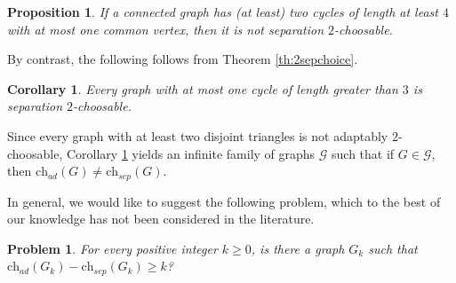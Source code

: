 \documentclass[12pt]{article}
\newtheorem{problem}[theorem]{Problem}
\newtheorem{proposition}[theorem]{Proposition}
\newtheorem{corollary}[theorem]{Corollary}
\newcommand{\single}{\chi_{\nleftrightarrow}}
\newcommand{\ch}{\mathrm{ch}}
\begin{document}
\begin{proposition}
\label{prop:disjointcycles}
If a connected graph has (at least) two
cycles of length at least $4$ with at most one common vertex,
 then it is 
not separation $2$-choosable.
\end{proposition}

	

	By contrast, the following follows from Theorem \ref{th:2sepchoice}.

\begin{corollary}
\label{cor:triangle}
	Every graph with at most one cycle of length greater than $3$ is separation 
	$2$-choosable.
\end{corollary}
	
Since every graph with at least two disjoint triangles is not adaptably $2$-choosable,
Corollary \ref{cor:triangle} yields an infinite
family of graphs $\mathcal{G}$ such that if $G \in \mathcal{G}$, then 
$\ch_{ad}(G) \neq \ch_{sep}(G)$.





%
%





In general, we would like to suggest the following problem, which to the best of our knowledge
has not been considered in the literature.

\begin{problem}
	For every positive integer $k \geq 0$, is there a graph $G_k$ such that
	$\ch_{ad}(G_k) - \ch_{sep}(G_k) \geq k$?
\end{problem}
\end{document}
